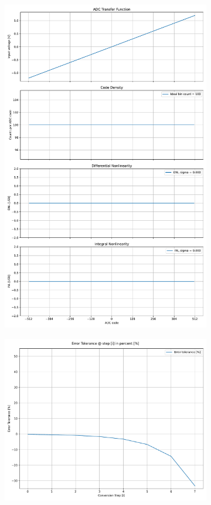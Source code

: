 \documentclass[varwidth]{standalone}
\begin{document}
\begin{figure}
\begin{subfigure}{0.32\textwidth}
    \includegraphics[width=\textwidth]{behavioral_10b_ideal_nonlinearity.pdf}
\end{subfigure}
\begin{subfigure}{0.32\textwidth}
    \includegraphics[width=\textwidth]{behavioral_10b_ideal_redundancy.pdf}

\end{subfigure}
\end{figure}
\end{document}
